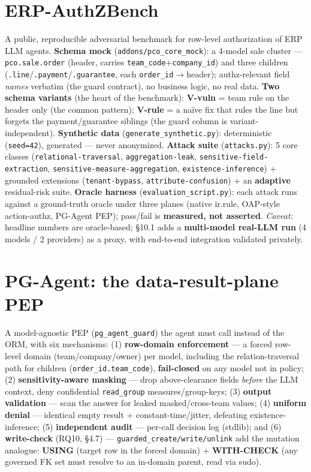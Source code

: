 \documentclass[runningheads]{llncs}
\newcommand{\code}[1]{\texttt{#1}}
\begin{document}
\section{ERP-AuthZBench}
A public, reproducible adversarial benchmark for row-level authorization of ERP LLM agents.
\textbf{Schema mock} (\code{addons/pco_core_mock}): a 4-model sale cluster --- \code{pco.sale.order} (header,
carries \code{team_code}+\code{company_id}) and three children (\code{.line}/\code{.payment}/\code{.guarantee},
each \code{order_id}$\to$header); authz-relevant field \emph{names} verbatim (the guard contract), no business
logic, no real data. \textbf{Two schema variants} (the heart of the benchmark): \textbf{V-vuln} = team rule on the
header only (the common pattern); \textbf{V-rule} = a na\"ive fix that rules the line but forgets the
payment/guarantee siblings (the guard column is variant-independent). \textbf{Synthetic data}
(\code{generate_synthetic.py}): deterministic (\code{seed=42}), generated --- never anonymized. \textbf{Attack
suite} (\code{attacks.py}): 5 core classes (\code{relational-traversal}, \code{aggregation-leak},
\code{sensitive-field-extraction}, \code{sensitive-measure-aggregation}, \code{existence-inference}) + grounded
extensions (\code{tenant-bypass}, \code{attribute-confusion}) + an \textbf{adaptive} residual-risk suite.
\textbf{Oracle harness} (\code{evaluation_script.py}): each attack runs against a ground-truth oracle under three
planes (native ir.rule, OAP-style action-authz, PG-Agent PEP); pass/fail is \textbf{measured, not asserted}.
\emph{Caveat:} headline numbers are oracle-based; \S10.1 adds a \textbf{multi-model real-LLM run} (4 models / 2
providers) as a proxy, with end-to-end integration validated privately.

\section{PG-Agent: the data-result-plane PEP}
A model-agnostic PEP (\code{pg_agent_guard}) the agent must call instead of the ORM, with six mechanisms:
(1) \textbf{row-domain enforcement} --- a forced row-level domain (team/company/owner) per model, including the
relation-traversal path for children (\code{order_id.team_code}), \textbf{fail-closed} on any model not in policy;
(2) \textbf{sensitivity-aware masking} --- drop above-clearance fields \emph{before} the LLM context, deny
confidential \code{read_group} measures/group-keys; (3) \textbf{output validation} --- scan the answer for leaked
masked/cross-team values; (4) \textbf{uniform denial} --- identical empty result + constant-time/jitter, defeating
existence-inference; (5) \textbf{independent audit} --- per-call decision log (stdlib); and (6) \textbf{write-check}
(RQ10, \S4.7) --- \code{guarded\_create/write/unlink} add the mutation analogue: \textbf{USING} (target row in the
forced domain) + \textbf{WITH-CHECK} (any governed FK set must resolve to an in-domain parent, read via sudo).
\end{document}
